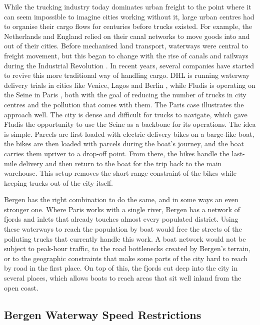 \documentclass[12pt]{article}
\begin{document}
While the trucking industry today dominates urban freight to the point where it can seem impossible to imagine cities working without it, large urban centres had to organise their cargo flows for centuries before trucks existed. For example, the Netherlands and England relied on their canal networks to move goods into and out of their cities. Before mechanised land transport, waterways were central to freight movement, but this began to change with the rise of canals and railways during the Industrial Revolution \parencite{rodrigue2024emergence}. In recent years, several companies have started to revive this more traditional way of handling cargo. DHL is running waterway delivery trials in cities like Venice, Lagos and Berlin \parencite{dhlboats}, while Fludis is operating on the Seine in Paris \parencite{fludis}, both with the goal of reducing the number of trucks in city centres and the pollution that comes with them. The Paris case illustrates the approach well. The city is dense and difficult for trucks to navigate, which gave Fludis the opportunity to use the Seine as a backbone for its operations. The idea is simple. Parcels are first loaded with electric delivery bikes on a barge-like boat, the bikes are then loaded with parcels during the boat's journey, and the boat carries them upriver to a drop-off point. From there, the bikes handle the last-mile delivery and then return to the boat for the trip back to the main warehouse. This setup removes the short-range constraint of the bikes while keeping trucks out of the city itself.

Bergen has the right combination to do the same, and in some ways an even stronger one. Where Paris works with a single river, Bergen has a network of fjords and inlets that already touches almost every populated district. Using these waterways to reach the population by boat would free the streets of the polluting trucks that currently handle this work. A boat network would not be subject to peak-hour traffic, to the road bottlenecks created by Bergen's terrain, or to the geographic constraints that make some parts of the city hard to reach by road in the first place. On top of this, the fjords cut deep into the city in several places, which allows boats to reach areas that sit well inland from the open coast.

\clearpage

\subsection{Bergen Waterway Speed Restrictions}
\label{subsec:bergen-waterway-speed-restriction}
\end{document}
